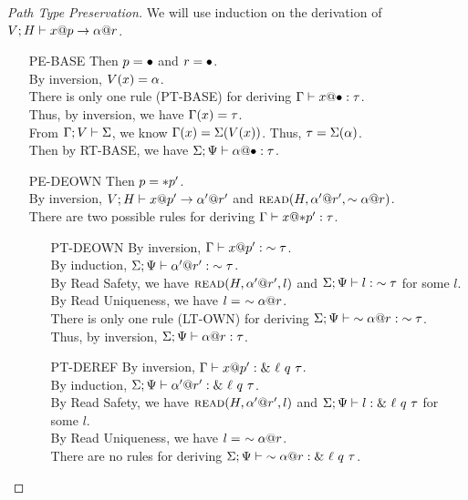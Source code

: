 \begin{proof}[Path Type Preservation]
  We will use induction on the derivation of ${V;H} \vdash {{x}@{p}} \to {{\alpha}@{r}}$.
  \begin{itemize}
    \item[PE-BASE] Then $p = \bullet$ and $r = \bullet$. \\
      By inversion, $V(x)=\alpha$. \\
      There is only one rule (\textsc{PT-BASE}) for deriving ${\Gamma} \vdash {{x}@{\bullet}} : {\tau}$. \\
      Thus, by inversion, we have $\Gamma(x)=\tau$. \\
      From $\Gamma;V\vdash\Sigma$, we know $\Gamma(x)=\Sigma(V(x))$. Thus, $\tau=\Sigma(\alpha)$. \\
      Then by \textsc{RT-BASE}, we have ${\Sigma;\Psi} \vdash {{\alpha}@{\bullet}} : {\tau}$.
    \item[PE-DEOWN] Then $p = *{p'}$. \\
      By inversion, ${V;H} \vdash {{x}@{p'}} \to {{\alpha'}@{r'}}$
      and $\textsc{read}({H},{{\alpha'}@{r'}},{\sim{{\alpha}@{r}}})$. \\
      There are two possible rules for deriving ${\Gamma} \vdash {{x}@{*{p'}}} : {\tau}$.
      \begin{itemize}
	\item[PT-DEOWN]
	  By inversion, ${\Gamma} \vdash {{x}@{p'}} : {\sim{\tau}}$. \\
	  By induction, ${\Sigma;\Psi} \vdash {{\alpha'}@{r'}} : {\sim{\tau}}$. \\
	  By Read Safety, we have $\textsc{read}({H},{{\alpha'}@{r'}},{l})$
	  and ${\Sigma;\Psi} \vdash {l} : {\sim{\tau}}$ for some $l$. \\
	  By Read Uniqueness, we have $l =\ \own{\addr{\ga}{r}}$. \\
	  There is only one rule (\textsc{LT-OWN}) for deriving 
	  ${\Sigma;\Psi} \vdash {\sim{{\alpha}@{r}}} : {\sim{\tau}}$. \\
	  Thus, by inversion, ${\Sigma;\Psi} \vdash {{\alpha}@{r}} : {\tau}$.
	\item[PT-DEREF]
	  By inversion, ${\Gamma} \vdash {{x}@{p'}} : {\&~{{\ell}~{q}~{\tau}}}$. \\
	  By induction, ${\Sigma;\Psi} \vdash {{\alpha'}@{r'}} : {\&~{{\ell}~{q}~{\tau}}}$. \\
	  By Read Safety, we have $\textsc{read}({H},{{\alpha'}@{r'}},{l})$
	  and ${\Sigma;\Psi} \vdash {l} : {\&~{{\ell}~{q}~{\tau}}}$ for some $l$. \\
	  By Read Uniqueness, we have $l =\ \own{\addr{\ga}{r}}$. \\
	  There are no rules for deriving
	  ${\Sigma;\Psi} \vdash {\sim{{\alpha}@{r}}} : {\&~{{\ell}~{q}~{\tau}}}$. \\

\end{itemize}
\end{itemize}
\end{proof}

